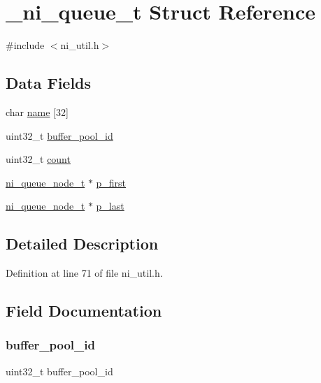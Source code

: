\hypertarget{struct__ni__queue__t}{}\section{\+\_\+ni\+\_\+queue\+\_\+t Struct Reference}
\label{struct__ni__queue__t}


{\ttfamily \#include $<$ni\+\_\+util.\+h$>$}

\subsection*{Data Fields}
\begin{DoxyCompactItemize}
\item 
char \mbox{\hyperlink{struct__ni__queue__t_abc1e86d7c344fe34ff09e72d4595ab7e}{name}} \mbox{[}32\mbox{]}
\item 
uint32\+\_\+t \mbox{\hyperlink{struct__ni__queue__t_a2e2d820dccdc18caa44f82512cb15d08}{buffer\+\_\+pool\+\_\+id}}
\item 
uint32\+\_\+t \mbox{\hyperlink{struct__ni__queue__t_a86988a65e0d3ece7990c032c159786d6}{count}}
\item 
\mbox{\hyperlink{ni__util_8h_aecbc45db1f33b1a7eb1b32a6be3e7cce}{ni\+\_\+queue\+\_\+node\+\_\+t}} $\ast$ \mbox{\hyperlink{struct__ni__queue__t_a768ec5faf7b000ebcdfb3a105f5938a2}{p\+\_\+first}}
\item 
\mbox{\hyperlink{ni__util_8h_aecbc45db1f33b1a7eb1b32a6be3e7cce}{ni\+\_\+queue\+\_\+node\+\_\+t}} $\ast$ \mbox{\hyperlink{struct__ni__queue__t_a337ed7e32c929deb2cc1dc12f52f21b8}{p\+\_\+last}}
\end{DoxyCompactItemize}


\subsection{Detailed Description}


Definition at line 71 of file ni\+\_\+util.\+h.



\subsection{Field Documentation}
\mbox{\label{struct__ni__queue__t_a2e2d820dccdc18caa44f82512cb15d08}} 
\subsubsection{\texorpdfstring{buffer\_pool\_id}{buffer\_pool\_id}}
{\footnotesize\ttfamily uint32\+\_\+t buffer\+\_\+pool\+\_\+id}



